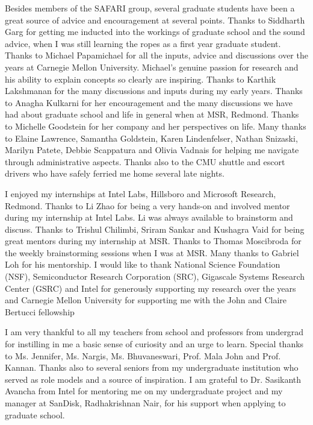 Besides members of the SAFARI group, several graduate students
have been a great source of advice and encouragement at several
points. Thanks to Siddharth Garg for getting me inducted into the
workings of graduate school and the sound advice, when I was still
learning the ropes as a first year graduate student. Thanks to
Michael Papamichael for all the inputs, advice and discussions
over the years at Carnegie Mellon University. Michael's genuine
passion for research and his ability to explain concepts so
clearly are inspiring. Thanks to Karthik Lakshmanan for the many
discussions and inputs during my early years. Thanks to Anagha
Kulkarni for her encouragement and the many discussions we have
had about graduate school and life in general when at MSR,
Redmond. Thanks to Michelle Goodstein for her company and her
perspectives on life. Many thanks to Elaine Lawrence, Samantha
Goldstein, Karen Lindenfelser, Nathan Snizaski, Marilyn Patete,
Debbie Scappatura and Olivia Vadnais for helping me navigate
through administrative aspects. Thanks also to the CMU shuttle and
escort drivers who have safely ferried me home several late
nights.

I enjoyed my internships at Intel Labs, Hillsboro and Microsoft
Research, Redmond. Thanks to Li Zhao for being a very hands-on and
involved mentor during my internship at Intel Labs. Li was always
available to brainstorm and discuss. Thanks to Trishul Chilimbi,
Sriram Sankar and Kushagra Vaid for being great mentors during my
internship at MSR. Thanks to Thomas Moscibroda for the weekly
brainstorming sessions when I was at MSR. Many thanks to Gabriel
Loh for his mentorship. I would like to thank National Science
Foundation (NSF), Semiconductor Research Corporation (SRC),
Gigascale Systems Research Center (GSRC) and Intel for generously
supporting my research over the years and Carnegie Mellon
University for supporting me with the John and Claire Bertucci
fellowship

I am very thankful to all my teachers from school and professors
from undergrad for instilling in me a basic sense of curiosity and
an urge to learn. Special thanks to Ms. Jennifer, Ms. Nargis, Ms.
Bhuvaneswari, Prof. Mala John and Prof. Kannan. Thanks also to
several seniors from my undergraduate institution who served as
role models and a source of inspiration. I am grateful to Dr.
Sasikanth Avancha from Intel for mentoring me on my undergraduate
project and my manager at SanDisk, Radhakrishnan Nair, for his
support when applying to graduate school.

